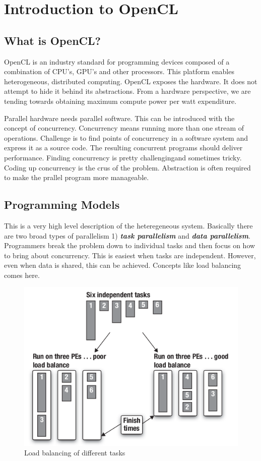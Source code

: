 {\color{red} \date{30-May-2020}}
\Large
\chapter{Introduction to OpenCL}
\section{What is OpenCL?}
OpenCL is an industry standard for programming devices composed of a combination of CPU's, GPU's and other processors. This platform enables heterogeneous, distributed computing. OpenCL exposes the hardware. It does not attempt to hide it behind its abstractions. From a hardware perspective, we are tending towards obtaining maximum compute power per watt expenditure. 

Parallel hardware needs parallel software. This can be introduced with the concept of concurrency. Concurrency means running more than one stream of operations. Challenge is to find points of concurrency in a software system and express it as a source code. The resulting concurrent programs should deliver performance. Finding concurrency is pretty challengingand sometimes tricky. Coding up concurrency is the crus of the problem. Abstraction is often required to make the prallel program more manageable. 

\section{Programming Models}
This is a very high level description of the heteregeneous system. Basically there are two broad types of parallelism 1) \textit{\textbf{task parallelism}} and \textit{\textbf{data parallelism}}. Programmers break the problem down to individual tasks and then focus on how to bring about concurrency. This is easiest when tasks are independent. However, even when data is shared, this can be achieved. Concepts like load balancing comes here.

\begin{figure}[H]
  \centering
  \includegraphics[scale=0.5]{./images/load_balancing.png}
  \caption{Load balancing of different tasks}
  \label{load balancing}
\end{figure}

